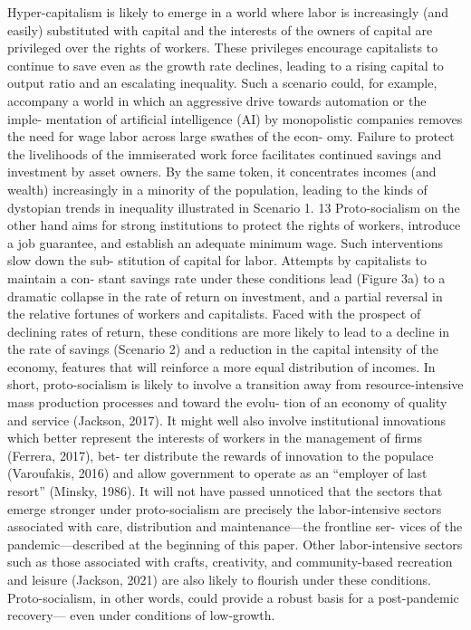 \documentclass[
]{book}
\begin{document}
Hyper-capitalism is likely to emerge in a world where labor is
increasingly (and easily) substituted with capital and the interests of
the owners of capital are privileged over the rights of workers. These
privileges encourage capitalists to continue to save even as the
growth rate declines, leading to a rising capital to output ratio and an
escalating inequality. Such a scenario could, for example, accompany a
world in which an aggressive drive towards automation or the imple-
mentation of artificial intelligence (AI) by monopolistic companies
removes the need for wage labor across large swathes of the econ-
omy. Failure to protect the livelihoods of the immiserated work force
facilitates continued savings and investment by asset owners. By the
same token, it concentrates incomes (and wealth) increasingly in a
minority of the population, leading to the kinds of dystopian trends in
inequality illustrated in Scenario 1.
13
Proto-socialism on the other hand aims for strong institutions to
protect the rights of workers, introduce a job guarantee, and establish
an adequate minimum wage. Such interventions slow down the sub-
stitution of capital for labor. Attempts by capitalists to maintain a con-
stant savings rate under these conditions lead (Figure 3a) to a
dramatic collapse in the rate of return on investment, and a partial
reversal in the relative fortunes of workers and capitalists. Faced with
the prospect of declining rates of return, these conditions are more
likely to lead to a decline in the rate of savings (Scenario 2) and a
reduction in the capital intensity of the economy, features that will
reinforce a more equal distribution of incomes.
In short, proto-socialism is likely to involve a transition away from
resource-intensive mass production processes and toward the evolu-
tion of an economy of quality and service (Jackson, 2017). It might
well also involve institutional innovations which better represent the
interests of workers in the management of firms (Ferrera, 2017), bet-
ter distribute the rewards of innovation to the populace
(Varoufakis, 2016) and allow government to operate as an ``employer
of last resort'' (Minsky, 1986).
It will not have passed unnoticed that the sectors that emerge
stronger under proto-socialism are precisely the labor-intensive sectors
associated with care, distribution and maintenance---the frontline ser-
vices of the pandemic---described at the beginning of this paper. Other
labor-intensive sectors such as those associated with crafts, creativity,
and community-based recreation and leisure (Jackson, 2021) are also
likely to flourish under these conditions. Proto-socialism, in other
words, could provide a robust basis for a post-pandemic recovery---
even under conditions of low-growth.
\end{document}

